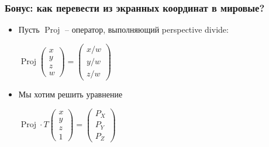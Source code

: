 \documentclass[10pt]{beamer}
\begin{document}
\begin{frame}[fragile]
\frametitle{Бонус: как перевести из экранных координат в мировые?}
\begin{itemize}
\item Пусть \begin{math}\operatorname{Proj}\end{math} -- оператор, выполняющий perspective divide:
\begin{center}
\begin{math}
\operatorname{Proj}\begin{pmatrix}x \\ y \\ z \\ w\end{pmatrix} = \begin{pmatrix}x/w \\ y/w \\ z/w\end{pmatrix}
\end{math}
\end{center}
\pause
\item Мы хотим решить уравнение
\begin{center}
\begin{math}
\operatorname{Proj}\cdot T \begin{pmatrix}x \\ y \\ z \\ 1\end{pmatrix} = \begin{pmatrix}P_X \\ P_Y \\ P_Z\end{pmatrix}
\end{math}
\end{center}
\end{itemize}
\end{frame}
\end{document}
